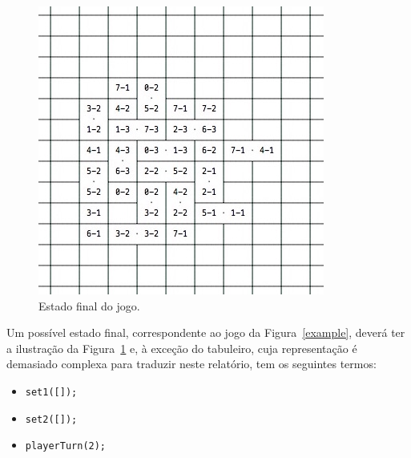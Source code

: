 \documentclass[a4paper]{article}
\begin{document}
\begin{figure}[htbp]
\begin{center}
\includegraphics[scale=0.6]{over.jpg}
\caption{Estado final do jogo.}
\label{over}
\end{center}
\end{figure}

Um possível estado final, correspondente ao jogo da Figura~\ref{example}, deverá ter a ilustração da Figura~\ref{over} e, à exceção do tabuleiro, cuja representação é demasiado complexa para traduzir neste relatório, tem os seguintes termos:
\begin{itemize}
\item 
\verb|set1([]);|
\item
\verb|set2([]);|
\item \verb|playerTurn(2);|	
\end{itemize}

\end{document}
